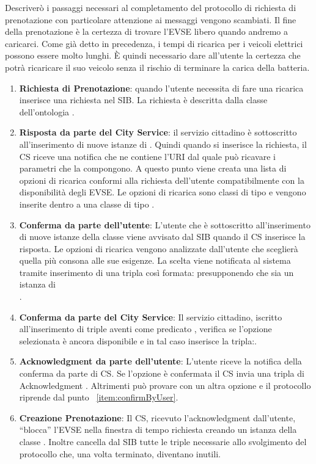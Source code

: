 Descriverò i passaggi necessari al completamento del protocollo di richiesta di prenotazione con particolare attenzione ai messaggi vengono scambiati. Il fine della prenotazione è la certezza di trovare l'EVSE libero quando andremo a caricarci. Come già detto in precedenza, i tempi di ricarica per i veicoli elettrici possono essere molto lunghi. È quindi necessario dare all'utente la certezza che potrà ricaricare il suo veicolo senza il rischio di terminare la carica della batteria.

\begin{enumerate}[label=\textbf{\arabic*}]
	\item \textbf{Richiesta di Prenotazione}: quando l'utente necessita di fare una ricarica inserisce una richiesta nel SIB. La richiesta è descritta dalla classe dell'ontologia .
	\item \textbf{Risposta da parte del City Service}: il servizio cittadino è sottoscritto all'inserimento di nuove istanze di . Quindi quando si inserisce la richiesta, il CS riceve una notifica che ne contiene l'URI dal quale può ricavare i parametri che la compongono. A questo punto viene creata una lista di opzioni di ricarica conformi alla richiesta dell'utente compatibilmente con la disponibilità degli EVSE. Le opzioni di ricarica sono classi di tipo  e vengono inserite dentro a una classe di tipo .
	\item \label{item:confirmByUser} \textbf{Conferma da parte dell'utente}: L'utente che è sottoscritto all'inserimento di nuove istanze della classe  viene avvisato dal SIB quando il CS inserisce la risposta. Le opzioni di ricarica vengono analizzate dall'utente che sceglierà quella più consona alle sue esigenze. La scelta viene notificata al sistema tramite inserimento di una tripla così formata:  presupponendo che  sia un istanza di \\ .
	\item \textbf{Conferma da parte del City Service}: Il servizio cittadino, iscritto all'inserimento di triple aventi come predicato , verifica se l'opzione selezionata è ancora disponibile e in tal caso inserisce la tripla:. 
	\item \textbf{Acknowledgment da parte dell'utente}: L'utente riceve la notifica della conferma da parte di CS. Se l'opzione è confermata il CS invia una tripla di Acknowledgment . Altrimenti può provare con un altra opzione e il protocollo riprende dal punto ~\ref{item:confirmByUser}.
	\item \textbf{Creazione Prenotazione}: Il CS, ricevuto l'acknowledgment dall'utente, ``blocca'' l'EVSE nella finestra di tempo richiesta creando un istanza della classe . Inoltre cancella dal SIB tutte le triple necessarie allo svolgimento del protocollo che, una volta terminato, diventano inutili.
\end{enumerate}

